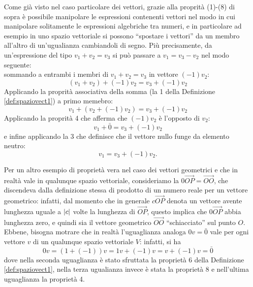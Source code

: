\begin{oss}
  \label{oss:spaziovect1}
  Come già visto nel caso particolare dei vettori, grazie alla proprità (1)-(8) di sopra è possibile manipolare le espressioni contenenti vettori nel modo in cui manipolare solitamente le espressioni algebriche tra numeri, e in particolare ad esempio in uno spazio vettoriale si possono ``spostare i vettori'' da un membro all'altro di un'ugualianza cambiandoli di segno. Più precisamente, da un'espressione del tipo $v_1+v_2=v_3$ si può passare a $v_1=v_3-v_2$ nel modo seguente:\\
  sommando a entrambi i membri di $v_1+v_2=v_3$ in vettore $(-1)v_2$:
  \begin{equation*}
    (v_1+v_2)+(-1)v_2=v_3+(-1)v_2
  \end{equation*}
  Applicando la proprità associativa della somma (la 1 della Definizione \ref{def:spaziovect1}) a primo memebro:
  \begin{equation*}
    v_1+(v_2+(-1)v_2)=v_3+(-1)v_2
  \end{equation*}
  Applicando la proprità 4 che afferma che $(-1)v_2$ è l'opposto di $v_2$:
  \begin{equation*}
    v_1+\bar{0}=v_3+(-1)v_2
  \end{equation*}
  e infine applicando la 3 che definisce che il vettore nullo funge da elemento neutro:
  \begin{equation*}
    v_1=v_3+(-1)v_2.
  \end{equation*}
\end{oss}
Per un altro esempio di proprietà vera nel caso dei vettori geometrici e che in realtà vale in qualunque spazio vettoriale, consideriamo la $0\vec{OP}=\vec{OO}$, che discendeva dalla definizione stessa di prodotto di un numero reale per un vettore geometrico: infatti, dal momento che in generale $c\vec{OP}$ denota un vettore avente lunghezza uguale a $\lvert c\rvert$ volte la lunghezza di $\vec{OP}$, questo implica che $0\vec{OP}$ abbia lunghezza zero, e quindi sia il vettore geometrico $\vec{OO}$ ``schiacciato'' sul punto $O$.\\
Ebbene, bisogna motrare che in realtà l'uguaglianza analoga $0v=\bar{0}$ vale per ogni vettore $v$ di un qualunque spazio vettoriale $V$: infatti, si ha
\begin{equation*}
  0v=(1+(-1))v=1v+(-1)v=v+(-1)v=\bar{0}
\end{equation*}
dove nella seconda uguaglianza è stato sfruttata la proprietà 6 della Definizione \ref{def:spaziovect1}, nella terza ugualianza invece è stata la proprietà 8 e nell'ultima uguaglianza la proprietà 4.\\
